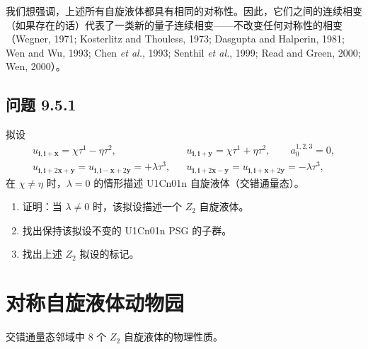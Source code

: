
我们想强调，上述所有自旋液体都具有相同的对称性。因此，它们之间的连续相变（如果存在的话）代表了一类新的量子连续相变——不改变任何对称性的相变（Wegner, 1971; Kosterlitz and Thouless, 1973; Dasgupta and Halperin, 1981; Wen and Wu, 1993; Chen \emph{et al.}, 1993; Senthil \emph{et al.}, 1999; Read and Green, 2000; Wen, 2000）。

\subsection*{问题 9.5.1}

拟设
\begin{equation*}
\begin{array}{rcl}
u_{\pmb{i},\pmb{i}+\pmb{x}}=\chi\tau^{1}-\eta\tau^{2}, & & u_{\pmb{i},\pmb{i}+\pmb{y}}=\chi\tau^{1}+\eta\tau^{2},\qquad a_{0}^{1,2,3}=0,\\[2pt]
u_{\pmb{i},\pmb{i}+2\pmb{x}+\pmb{y}}=u_{\pmb{i},\pmb{i}-\pmb{x}+2\pmb{y}}=+\lambda\tau^{3}, & & u_{\pmb{i},\pmb{i}+2\pmb{x}-\pmb{y}}=u_{\pmb{i},\pmb{i}+\pmb{x}+2\pmb{y}}=-\lambda\tau^{3},
\end{array}
\end{equation*}
在 $\chi\neq\eta$ 时，$\lambda=0$ 的情形描述 U1Cn01n 自旋液体（交错通量态）。
\begin{enumerate}
\item 证明：当 $\lambda\neq0$ 时，该拟设描述一个 $Z_{2}$ 自旋液体。
\item 找出保持该拟设不变的 U1Cn01n PSG 的子群。
\item 找出上述 $Z_{2}$ 拟设的标记。
\end{enumerate}

\section{对称自旋液体动物园}

\begin{keypoints}
\item 交错通量态邻域中 8 个 $Z_{2}$ 自旋液体的物理性质。
\end{keypoints}

